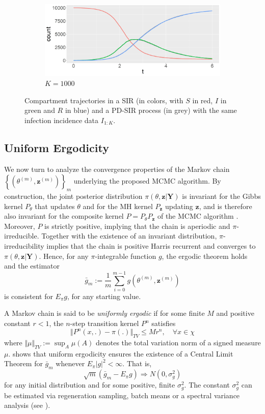 \documentclass[12pt]{article}
\begin{document}
\begin{figure}
\begin{center}
			\begin{subfigure}[b]{0.49\textwidth}
				\centering
				\includegraphics[width=\textwidth]{E2_K1000}
				\caption{$K = 1000$}
				\label{fig:comparison_RD_SIR_K1000}
			\end{subfigure}
		\end{center}
		\caption{Compartment trajectories in a SIR (in colors, with $S$ in red, $I$ in green and $R$ in blue) and a PD-SIR process (in grey) with the same infection incidence data $I_{1:K}$. \label{fig:comparison}}
	\end{figure}
	
	\subsection{Uniform Ergodicity}
	\label{sec:uni}
	We now turn to analyze the convergence properties of the Markov chain $\left\{\left(\theta^{(m)}, \mathbf{z}^{(m)}\right)\right\}_m$ underlying the proposed MCMC algorithm. By construction, the joint posterior distribution $\pi(\theta, \mathbf{z}|\mathbf{Y})$ is invariant for the Gibbs kernel $P_\theta$ that updates $\theta$ and for the MH kernel $P_\mathbf{z}$ updating $\mathbf{z}$, and is therefore also invariant for the composite kernel $P=P_\theta P_\mathbf{z}$ of the MCMC algorithm \citep{Tierney.1994}. Moreover, $P$ is strictly positive, implying that the chain is aperiodic and $\pi$-irreducible. Together with the existence of an invariant distribution, $\pi$-irreducibility implies that the chain is positive Harris recurrent and converges to $\pi(\theta, \mathbf{z}|\mathbf{Y})$. Hence, for any $\pi$-integrable function $g$, the ergodic theorem holds and the estimator
	$$\bar{g}_m := \frac{1}{m} \sum_{i=0}^{m-1} g\left(\theta^{(m)}, \mathbf{z}^{(m)}\right)$$
	is consistent for $E_\pi g$, for any starting value. 
	
	A Markov chain is said to be \textit{uniformly ergodic} if for some finite $M$ and positive constant $r<1$, the $n$-step transition kernel $P^n$ satisfies
	$$
	\Vert P^n(x,.)-\pi(.)\Vert_{TV} \le M r^n, \quad \forall x \in \chi
	$$
	where $\Vert \mu \Vert_{TV} := \sup_A \mu(A)$ denotes the total variation norm of a signed measure $\mu$.
	\cite{Jones.2004b} shows that uniform ergodicity ensures the existence of a Central Limit Theorem for $\bar{g}_m$ whenever $E_\pi |g|^2 < \infty$. That is,
	$$\sqrt{m}(\bar{g}_m - E_\pi g) \Rightarrow N(0, \sigma^2_g)$$
	for any initial distribution and for some positive, finite $\sigma^2_g$. The constant $\sigma^2_g$ can be estimated via regeneration sampling, batch means or a spectral variance analysis (see \cite{Flegal.2010}).
	
\end{document}
